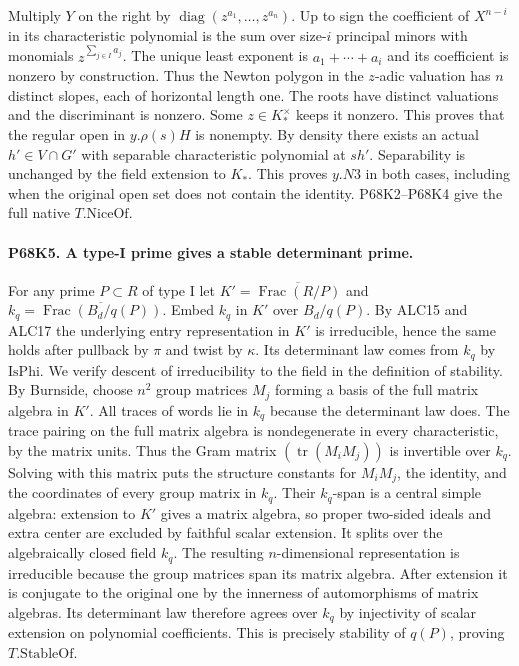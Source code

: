 Multiply $Y$ on the right by
$\operatorname{diag}(z^{a_1},\ldots,z^{a_n})$. Up to sign the
coefficient of $X^{n-i}$ in its characteristic polynomial is
the sum over size-$i$ principal minors with monomials
$z^{\sum_{j\in I}a_j}$. The unique least exponent is
$a_1+\cdots+a_i$ and its coefficient is nonzero by construction.
Thus the Newton polygon in the $z$-adic valuation has $n$
distinct slopes, each of horizontal length one. The roots have
distinct valuations and the discriminant is nonzero. Some
$z\in K_*^\times$ keeps it nonzero. This proves that the regular
open in $y.\rho(s)H$ is nonempty. By density there exists an
actual $h'\in V\cap G'$ with separable characteristic polynomial
at $s h'$. Separability is unchanged by the field extension to
$K_*$. This proves $y.N3$ in both cases, including when the
original open set does not contain the identity. P68K2--P68K4
give the full native $T.\mathrm{NiceOf}$.

\paragraph{P68K5. A type-I prime gives a stable determinant prime.}
For any prime $P\subset R$ of type I let
$K'=\overline{\operatorname{Frac}(R/P)}$ and
$k_q=\overline{\operatorname{Frac}(B_d/q(P))}$. Embed $k_q$
in $K'$ over $B_d/q(P)$. By ALC15 and ALC17 the underlying
entry representation in $K'$ is irreducible, hence the same
holds after pullback by $\pi$ and twist by $\kappa$. Its
determinant law comes from $k_q$ by $\mathrm{IsPhi}$.
We verify descent of irreducibility to the field in the definition
of stability. By Burnside, choose $n^2$ group matrices $M_j$
forming a basis of the full matrix algebra in $K'$. All traces
of words lie in $k_q$ because the determinant law does. The
trace pairing on the full matrix algebra is nondegenerate in
every characteristic, by the matrix units. Thus the Gram matrix
$(\operatorname{tr}(M_iM_j))$ is invertible over $k_q$. Solving
with this matrix puts the structure constants for $M_iM_j$,
the identity, and the coordinates of every group matrix in
$k_q$. Their $k_q$-span is a central simple algebra: extension
to $K'$ gives a matrix algebra, so proper two-sided ideals and
extra center are excluded by faithful scalar extension. It
splits over the algebraically closed field $k_q$. The resulting
$n$-dimensional representation is irreducible because the group
matrices span its matrix algebra. After extension it is conjugate
to the original one by the innerness of automorphisms of matrix
algebras. Its determinant law therefore agrees over $k_q$ by
injectivity of scalar extension on polynomial coefficients. This
is precisely stability of $q(P)$, proving $T.\mathrm{StableOf}$.

